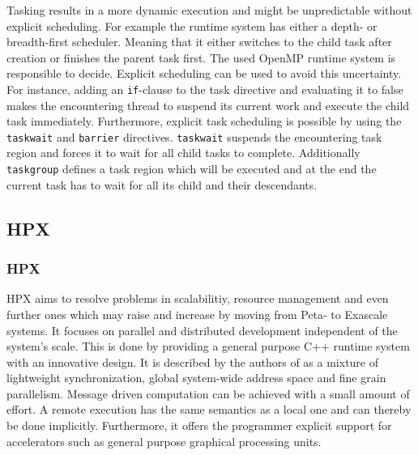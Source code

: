   Tasking results in a more dynamic execution and might be unpredictable without explicit scheduling.
  For example the runtime system has either a depth- or breadth-first scheduler.
  Meaning that it either switches to the child task after creation or finishes the parent task first.
  The used OpenMP runtime system is responsible to decide.
  Explicit scheduling can be used to avoid this uncertainty.
  For instance, adding an \texttt{if}-clause to the task directive and evaluating it to false makes the encountering thread to suspend its current work and execute the child task immediately.
  Furthermore, explicit task scheduling is possible by using the \texttt{taskwait} and \texttt{barrier} directives.
  \texttt{taskwait} suspends the encountering task region and forces it to wait for all child tasks to complete.
  Additionally \texttt{taskgroup} defines a task region which will be executed and at the end the current task has to wait for all its child and their descendants.~\cite{Qawasmeh.2014}~\cite{Furlinger.2009}


\subsection{HPX}
\label{subsec:HPX}
\subsubsection{HPX}
  
  HPX aims to resolve problems in scalabilitiy, resource management and even further ones which may raise and increase by moving from Peta- to Exascale systems.
  It focuses on parallel and distributed development independent of the system's scale.
  This is done by providing a general purpose C++ runtime system with an innovative design.
  It is described by the authors of \cite{Kaiser.2014} as a mixture of lightweight synchronization, global system-wide address space and fine grain parallelism.
  Message driven computation can be achieved with a small amount of effort.
  A remote execution has the same semantics as a local one and can thereby be done implicitly.
  Furthermore, it offers the programmer explicit support for accelerators such as general purpose graphical processing units.~\cite{Kaiser.2014}
  

